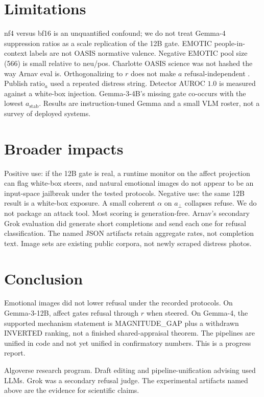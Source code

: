 \documentclass{article}
\begin{document}
\section{Limitations}
\label{sec:limitations}

nf4 versus bf16 is an unquantified confound; we do not treat Gemma-4 suppression ratios as a scale replication of the 12B gate. EMOTIC people-in-context labels are not OASIS normative valence. Negative EMOTIC pool size (566) is small relative to neu/pos. Charlotte OASIS science was not hashed the way Arnav eval is. Orthogonalizing to $r$ does not make $a$ refusal-independent \citep{wollschlager2025geometry}. Publish $\mathrm{ratio}_a$ used a repeated distress string. Detector AUROC $1.0$ is measured against a white-box injection. Gemma-3-4B's missing gate co-occurs with the lowest $a_{\mathrm{stab}}$. Results are instruction-tuned Gemma and a small VLM roster, not a survey of deployed systems.

\section{Broader impacts}
\label{sec:impacts}

Positive use: if the 12B gate is real, a runtime monitor on the affect projection can flag white-box steers, and natural emotional images do not appear to be an input-space jailbreak under the tested protocols. Negative use: the same 12B result is a white-box exposure. A small coherent $\alpha$ on $a_\perp$ collapses refuse. We do not package an attack tool. Most scoring is generation-free. Arnav's secondary Grok evaluation did generate short completions and send each one for refusal classification. The named JSON artifacts retain aggregate rates, not completion text. Image sets are existing public corpora, not newly scraped distress photos.

\section{Conclusion}

Emotional images did not lower refusal under the recorded protocols. On Gemma-3-12B, affect gates refusal through $r$ when steered. On Gemma-4, the supported mechanism statement is MAGNITUDE\_GAP plus a withdrawn INVERTED ranking, not a finished shared-appraisal theorem. The pipelines are unified in code and not yet unified in confirmatory numbers. This is a progress report.

\begin{ack}
Algoverse research program. Draft editing and pipeline-unification advising used LLMs. Grok was a secondary refusal judge. The experimental artifacts named above are the evidence for scientific claims.
\end{ack}
\end{document}
